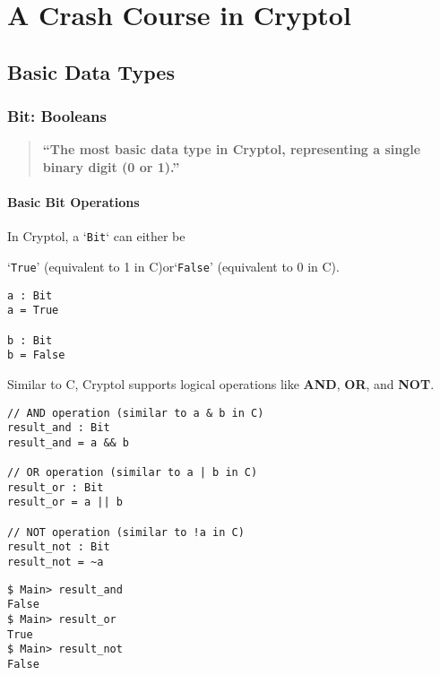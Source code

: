 \chapter{A Crash Course in Cryptol}

\section{Basic Data Types}

\subsection{Bit: Booleans}
\begin{quote}\bf
	``The most basic data type in Cryptol, representing a single binary digit (0 or 1).''
\end{quote}

\subsubsection{Basic Bit Operations}

\begin{tcolorbox}[colframe=defcolor,title={\color{white}\bf Data Type: \texttt{Bit}}]
In Cryptol, a `\texttt{Bit}` can either be \begin{center}
`\texttt{True}' (equivalent to 1 in C)\quad or\quad `\texttt{False}' (equivalent to 0 in C).
\end{center}
\end{tcolorbox}

\begin{lstlisting}[style=cryptol]
a : Bit
a = True

b : Bit
b = False
\end{lstlisting}

\noindent Similar to C, Cryptol supports logical operations like \textbf{AND}, \textbf{OR}, and \textbf{NOT}.
\begin{lstlisting}[style=cryptol]
// AND operation (similar to a & b in C)
result_and : Bit
result_and = a && b

// OR operation (similar to a | b in C)
result_or : Bit
result_or = a || b

// NOT operation (similar to !a in C)
result_not : Bit
result_not = ~a
\end{lstlisting}

\begin{lstlisting}[style=zsh]
$ Main> result_and
False
$ Main> result_or
True
$ Main> result_not
False 
\end{lstlisting}

